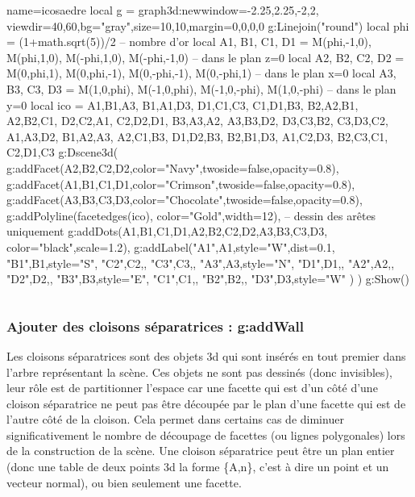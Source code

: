 \documentclass[%
10pt,%
a4paper,%
french,%
]%
{article}%
\newenvironment*{demo}[2][]{%
\gdef\legende{#2}%
\gdef\lab{#1}%
\bgroup
\VerbatimOut{\jobname.tmp}%
}%
{%
\endVerbatimOut%
\egroup%
\inputminted[ignorelexererrors=true,breaklines,bgcolor=Beige,linenos,numbersep=6pt,frame=single,fontsize=\footnotesize]{Lua}{\jobname.tmp}%
\begin{minipage}{0.9\textwidth}
\begin{center}
\captionof{figure}{\legende}\label{\lab}%
%
\end{center}
\end{minipage}
}
\begin{document}
\begin{demo}{Construction d'un icosaèdre}
\begin{luadraw}{name=icosaedre}
local g = graph3d:new{window={-2.25,2.25,-2,2}, viewdir={40,60},bg="gray",size={10,10},margin={0,0,0,0}}
g:Linejoin("round")
local phi = (1+math.sqrt(5))/2 -- nombre d'or
local A1, B1, C1, D1 = M(phi,-1,0), M(phi,1,0), M(-phi,1,0), M(-phi,-1,0) -- dans le plan z=0
local A2, B2, C2, D2 = M(0,phi,1), M(0,phi,-1), M(0,-phi,-1), M(0,-phi,1) -- dans le plan x=0
local A3, B3, C3, D3 = M(1,0,phi), M(-1,0,phi), M(-1,0,-phi), M(1,0,-phi) -- dans le plan y=0
local ico = {   {A1,B1,A3}, {B1,A1,D3}, {D1,C1,C3}, {C1,D1,B3},
                {B2,A2,B1}, {A2,B2,C1}, {D2,C2,A1}, {C2,D2,D1},
                {B3,A3,A2}, {A3,B3,D2}, {D3,C3,B2}, {C3,D3,C2},
                {A1,A3,D2}, {B1,A2,A3}, {A2,C1,B3}, {D1,D2,B3},
                {B2,B1,D3}, {A1,C2,D3}, {B2,C3,C1}, {C2,D1,C3}  }
g:Dscene3d(
    g:addFacet({A2,B2,C2,D2},{color="Navy",twoside=false,opacity=0.8}),
    g:addFacet({A1,B1,C1,D1},{color="Crimson",twoside=false,opacity=0.8}),
    g:addFacet({A3,B3,C3,D3},{color="Chocolate",twoside=false,opacity=0.8}),
    g:addPolyline(facetedges(ico), {color="Gold",width=12}), -- dessin des arêtes uniquement
    g:addDots({A1,B1,C1,D1,A2,B2,C2,D2,A3,B3,C3,D3}, {color="black",scale=1.2}),
    g:addLabel("A1",A1,{style="W",dist=0.1}, "B1",B1,{style="S"}, "C2",C2,{}, "C3",C3,{}, "A3",A3,{style="N"}, "D1",D1,{},  "A2",A2,{},  "D2",D2,{}, "B3",B3,{style="E"}, "C1",C1,{}, "B2",B2,{}, "D3",D3,{style="W"} )
)
g:Show()
\end{luadraw}
\end{demo}

\subsubsection{Ajouter des cloisons séparatrices : g:addWall}

Les cloisons séparatrices sont des objets 3d qui sont insérés en tout premier dans l'arbre représentant la scène. Ces objets ne sont pas dessinés (donc invisibles), leur rôle est de partitionner l'espace car une facette qui est d'un côté d'une cloison séparatrice ne peut pas être découpée par le plan d'une facette qui est de l'autre côté de la cloison. Cela permet dans certains cas de diminuer significativement le nombre de découpage de facettes (ou lignes polygonales) lors de la construction de la scène. Une cloison séparatrice peut être un plan entier (donc une table de deux points 3d la forme \{A,n\}, c'est à dire un point et un vecteur normal), ou bien seulement une facette.
\end{document}
